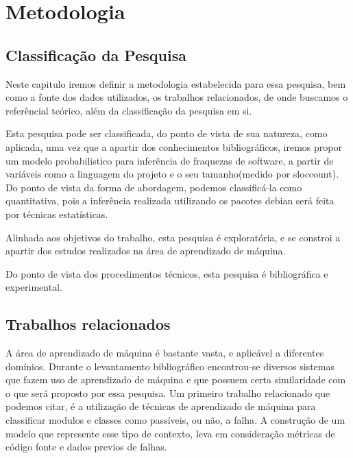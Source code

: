 \chapter{Metodologia}

\section{Classificação da Pesquisa}

Neste capitulo iremos definir a metodologia estabelecida para essa pesquisa, bem como
a fonte dos dados utilizados, os trabalhos relacionados, de onde buscamos o referêncial teórico,
além da classificação da pesquisa em si.

Esta pesquisa pode ser classificada, do ponto de vista de sua natureza, como aplicada, uma vez que a apartir dos conhecimentos bibliográficos,
iremos propor um modelo probabilistico para inferência de fraquezas de software, a partir de variáveis como a linguagem do projeto e o seu tamanho(medido por sloccount). Do ponto de vista da forma de abordagem, podemos classificá-la como
quantitativa, pois a inferência realizada utilizando os pacotes debian será feita por técnicas estatísticas.

Alinhada aos objetivos do trabalho, esta pesquisa é exploratória, e se constroi a apartir dos estudos realizados na área de aprendizado
de máquina.

Do ponto de vista dos procedimentos técnicos, esta pesquisa é bibliográfica e experimental.

\section{Trabalhos relacionados}

A área de aprendizado de máquina é bastante vasta, e aplicável a diferentes domínios.
Durante o levantamento bibliográfico encontrou-se diversos sistemas que fazem uso de aprendizado de máquina e que possuem certa similaridade com o que será proposto por essa pesquisa.
Um primeiro trabalho relacionado que podemos citar, é a utilização de técnicas de aprendizado de máquina para classificar modulos e classes como passíveis, ou não, a falha\cite{Malhotra}.
A construção de um modelo que represente esse tipo de contexto, leva em consideração métricas de código fonte e dados previos de falhas\cite{Malhotra}.

